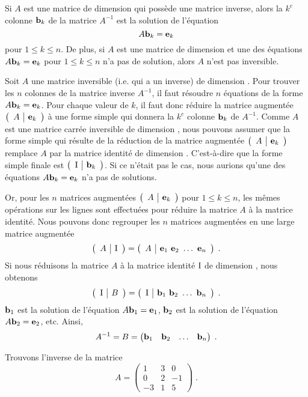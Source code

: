 {\begin{focus}{\prp}
Si $A$ est une matrice de dimension \nn qui possède une matrice
inverse, alors la $k^e$ colonne $\mathbf{b}_k$ de la matrice $A^{-1}$
est la solution de l'équation
\[
A\mathbf{b}_k = \mathbf{e}_k
\]
pour $1\leq k \leq n$.  De plus, si $A$ est une matrice de dimension
\nn et une des équations $A\mathbf{b}_k = \mathbf{e}_k$ pour $1\leq k \leq
n$ n'a pas de solution, alors $A$ n'est pas inversible.
\end{focus}

Soit $A$ une matrice inversible (i.e. qui a un inverse) de dimension
\nn.  Pour trouver les $n$ colonnes de la matrice inverse $A^{-1}$, il
faut résoudre $n$ équations de la forme $A\mathbf{b}_k = \mathbf{e}_k$.
Pour chaque valeur de $k$, il faut donc réduire la matrice augmentée
$\left(\begin{array}{c|c}{A}&{\mathbf{e}_k}\end{array}\right)$ à une forme simple qui donnera la $k^e$ colonne
$\mathbf{b}_k$ de $A^{-1}$.  Comme $A$ est une matrice carrée inversible
de dimension \nn, nous pouvons assumer que la forme simple qui résulte de
la réduction de la matrice augmentée $\left(\begin{array}{c|c}{A}&{\mathbf{e}_k}\end{array}\right)$ remplace
$A$ par la matrice identité de dimension \nn.  C'est-à-dire que la
forme simple finale est $\left(\begin{array}{c|c}{\operatorname{I}}&{\mathbf{b}_k}\end{array}\right)$.  Si ce n'était pas
le cas, nous aurions qu'une des équations $A\mathbf{b}_k = \mathbf{e}_k$ n'a
pas de solutions.

Or, pour les $n$ matrices augmentées $\left(\begin{array}{c|c}{A}&{\mathbf{e}_k}\end{array}\right)$ pour
$1\leq k \leq n$, les mêmes opérations sur les lignes sont effectuées
pour réduire la matrice $A$ à la matrice identité.  Nous pouvons donc
regrouper les $n$ matrices augmentées en une large matrice augmentée
\[
\Maug{A}{\Id} = \Maug{A}{\VEC{e}_1\ \VEC{e}_2\ \ldots\ \VEC{e}_n} \; .
\]
Si nous réduisons la matrice $A$ à la matrice identité $\operatorname{I}$ de dimension
\nn, nous obtenons
\[
\left(\begin{array}{c|c}{\operatorname{I}}&{B}\end{array}\right) = \left(\begin{array}{c|c}{\operatorname{I}}&{\mathbf{b}_1\ \mathbf{b}_2\ \ldots\ \mathbf{b}_n}\end{array}\right) \; .
\]
$\mathbf{b}_1$ est la solution de l'équation $A\mathbf{b}_1 = \mathbf{e}_1$,
$\mathbf{b}_2$ est la solution de l'équation $A\mathbf{b}_2 = \mathbf{e}_2$, etc.
Ainsi,
\[
A^{-1} = B = \begin{pmatrix} \mathbf{b}_1 & \mathbf{b}_2 & \ldots & \mathbf{b}_n
\end{pmatrix} \; .
\]

\begin{egg}
Trouvons l'inverse de la matrice
\[
A = \begin{pmatrix} 1 & 3 & 0 \\ 0 & 2 & -1 \\ -3 & 1 & 5 \end{pmatrix} \; .
\]


\end{egg}}
